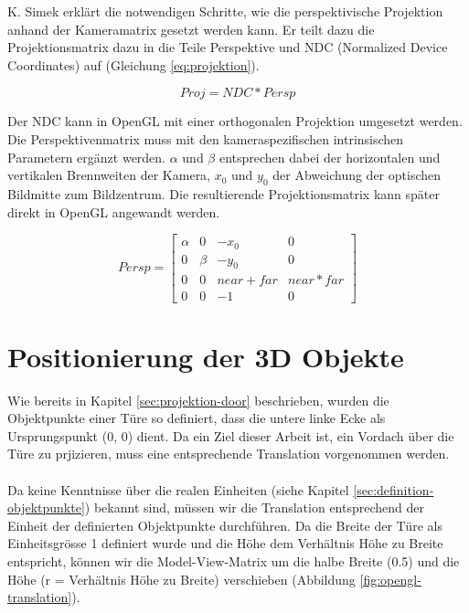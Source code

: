 K. Simek \cite{simek} erklärt die notwendigen Schritte, wie die perspektivische Projektion anhand der Kameramatrix gesetzt werden kann. Er teilt dazu die Projektionsmatrix dazu in die Teile Perspektive und NDC (Normalized Device Coordinates) auf (Gleichung \ref{eq:projektion}).

\begin{equation}
Proj = NDC * Persp
\label{eq:projektion}
\end{equation}

Der NDC kann in OpenGL mit einer orthogonalen Projektion umgesetzt werden. Die Perspektivenmatrix muss mit den kameraspezifischen intrinsischen Parametern ergänzt werden. $\alpha$ und $\beta$ entsprechen dabei der horizontalen und vertikalen Brennweiten der Kamera, $x_0$ und $y_0$ der Abweichung der optischen Bildmitte zum Bildzentrum. Die resultierende Projektionsmatrix kann später direkt in OpenGL angewandt werden.

\begin{equation}
Persp
=
\begin{bmatrix}
\alpha & 0 & -x_0 & 0 \\
0 & \beta & -y_0 & 0 \\
0 & 0 & near + far & near * far \\
0 & 0 & -1 & 0
\end{bmatrix} 
\end{equation}


\section{Positionierung der 3D Objekte}

Wie bereits in Kapitel \ref{sec:projektion-door} beschrieben, wurden die Objektpunkte einer Türe so definiert, dass die untere linke Ecke als Ursprungspunkt (0, 0) dient. Da ein Ziel dieser Arbeit ist, ein Vordach über die Türe zu prjizieren, muss eine entsprechende Translation vorgenommen werden.
\noindent \paragraph{}
Da keine Kenntnisse über die realen Einheiten (siehe Kapitel \ref{sec:definition-objektpunkte}) bekannt sind, müssen wir die Translation entsprechend der Einheit der definierten Objektpunkte durchführen. Da die Breite der Türe als Einheitsgrösse 1 definiert wurde und die Höhe dem Verhältnis Höhe zu Breite entspricht, können wir die Model-View-Matrix um die halbe Breite (0.5) und die Höhe (r = Verhältnis Höhe zu Breite) verschieben (Abbildung \ref{fig:opengl-translation}).

